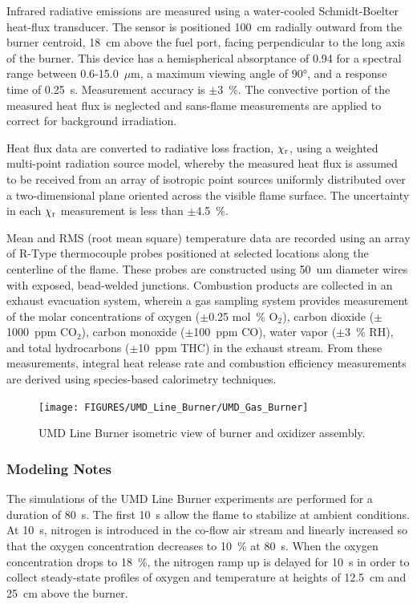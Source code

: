 Infrared radiative emissions are measured using a water-cooled Schmidt-Boelter heat-flux transducer. The sensor is positioned 100~cm radially outward from the burner centroid, 18~cm above the fuel port, facing perpendicular to the long axis of the burner. This device has a hemispherical absorptance of 0.94 for a spectral range between 0.6-15.0~$\mu$m, a maximum viewing angle of 90\si{\degree}, and a response time of 0.25~s. Measurement accuracy is $\pm$3~\%. The convective portion of the measured heat flux is neglected and sans-flame measurements are applied to correct for background irradiation.

Heat flux data are converted to radiative loss fraction, $\chi_{\rm r}$, using a weighted multi-point radiation source model, whereby the measured heat flux is assumed to be received from an array of isotropic point sources uniformly distributed over a two-dimensional plane oriented across the visible flame surface. The uncertainty in each $\chi_{\rm r}$ measurement is less than $\pm$4.5~\%.

Mean and RMS (root mean square) temperature data are recorded using an array of R-Type thermocouple probes positioned at selected locations along the centerline of the flame. These probes are constructed using 50~um diameter wires with exposed, bead-welded junctions. Combustion products are collected in an exhaust evacuation system, wherein a gas sampling system provides measurement of the molar concentrations of oxygen ($\pm$0.25 mol~\% O$_2$), carbon dioxide ($\pm$1000~ppm CO$_2$), carbon monoxide ($\pm$100~ppm CO), water vapor ($\pm$3~\% RH), and total hydrocarbons ($\pm$10~ppm THC) in the exhaust stream. From these measurements, integral heat release rate and combustion efficiency measurements are derived using species-based calorimetry techniques.

\begin{figure}[!ht]
\centering
\texttt{[image: FIGURES/UMD\_Line\_Burner/UMD\_Gas\_Burner]}
\caption[UMD Line Burner isometric view of burner and oxidizer assembly]{UMD Line Burner isometric view of burner and oxidizer assembly.}
\label{fig:umd_line_burner_plan_view}
\end{figure}

\subsubsection{Modeling Notes}

The simulations of the UMD Line Burner experiments are performed for a duration of 80~s. The first 10~s allow the flame to stabilize at ambient conditions. At 10~s, nitrogen is introduced in the co-flow air stream and linearly increased so that the oxygen concentration decreases to 10~\% at 80~s. When the oxygen concentration drops to 18~\%, the nitrogen ramp up is delayed for 10~s in order to collect steady-state profiles of oxygen and temperature at heights of 12.5~cm and 25~cm above the burner.

